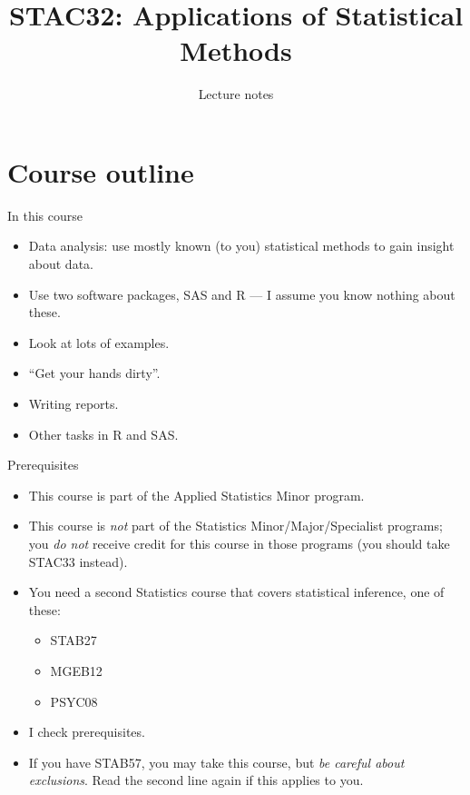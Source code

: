 \documentclass[ignorenonframetext,]{beamer}
\title{STAC32: Applications of Statistical Methods}
\author{Lecture notes}
\date{}
\providecommand{\tightlist}{%
  \setlength{\itemsep}{0pt}\setlength{\parskip}{0pt}}
\begin{document}
\frame{\titlepage}

\hypertarget{course-outline}{%
\section{Course outline}\label{course-outline}}

\begin{frame}{In this course}
\protect\hypertarget{in-this-course}{}

\begin{itemize}
\tightlist
\item
  Data analysis: use mostly known (to you) statistical methods to gain
  insight about data.
\item
  Use two software packages, SAS and R --- I assume you know nothing
  about these.
\item
  Look at lots of examples.
\item
  ``Get your hands dirty''.
\item
  Writing reports.
\item
  Other tasks in R and SAS.
\end{itemize}

\end{frame}

\begin{frame}{Prerequisites}
\protect\hypertarget{prerequisites}{}

\begin{itemize}
\tightlist
\item
  This course is part of the Applied Statistics Minor program.
\item
  This course is \emph{not} part of the Statistics
  Minor/Major/Specialist programs; you \emph{do not} receive credit for
  this course in those programs (you should take STAC33 instead).
\item
  You need a second Statistics course that covers statistical inference,
  one of these:

  \begin{itemize}
  \tightlist
  \item
    STAB27
  \item
    MGEB12
  \item
    PSYC08
  \end{itemize}
\item
  I check prerequisites.
\item
  If you have STAB57, you may take this course, but \emph{be careful
  about exclusions}. Read the second line again if this applies to you.
\end{itemize}

\end{frame}
\end{document}
